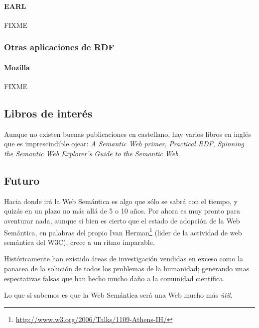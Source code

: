 \paragraph{EARL}

FIXME

\subsubsection{Otras aplicaciones de RDF}

\paragraph{Mozilla}

FIXME

\subsection{Libros de interés}

Aunque no existen buenas publicaciones en castellano, hay varios libros en inglés 
que es imprescindible ojear: \emph{A Semantic Web primer}\cite{SemanticWebPrimer},
\emph{Practical RDF}\cite{PracticalRDF}, 
\emph{Spinning the Semantic Web}\cite{SpinningSemanticWeb}
\emph{Explorer's Guide to the Semantic Web}\cite{ExplorerSemanticWeb}.

\subsection{Futuro}

Hacia donde irá la Web Semántica es algo que sólo se sabrá con el tiempo, y quizás
en un plazo no más allá de 5 o 10 años. Por ahora es muy pronto para aventurar nada,
aunque si bien es cierto que el estado de adopción de la Web Semántica, en palabras
del propio Ivan Herman\footnote{\url{http://www.w3.org/2006/Talks/1109-Athens-IH/}}
(lider de la actividad de web semántica del W3C), crece a un ritmo imparable.

Históricamente han existido áreas de investigación vendidas en exceso como la 
panacea de la solución de todos los problemas de la humanidad; generando unas 
espectativas falsas que han hecho mucho daño a la comunidad científica.

Lo que si sabemos es que la Web Semántica será una Web mucho más \emph{útil}.

